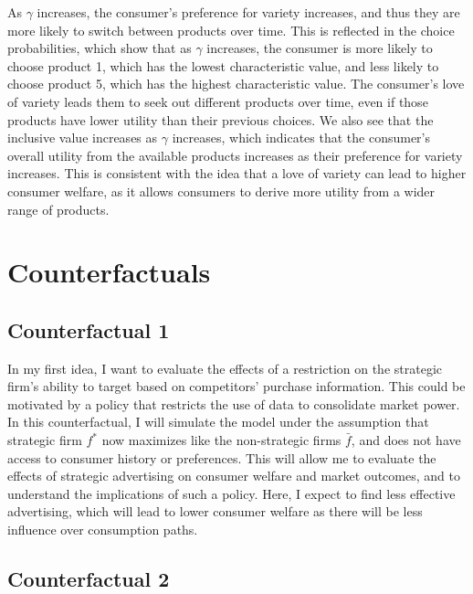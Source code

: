 \documentclass[12pt]{article}
\begin{document}
    As $\gamma$ increases, the consumer's preference for variety increases, and thus they are more likely to switch between products over time. This is reflected in the choice probabilities, which show that as $\gamma$ increases, the consumer is more likely to choose product 1, which has the lowest characteristic value, and less likely to choose product 5, which has the highest characteristic value. The consumer's love of variety leads them to seek out different products over time, even if those products have lower utility than their previous choices. We also see that the inclusive value increases as $\gamma$ increases, which indicates that the consumer's overall utility from the available products increases as their preference for variety increases. This is consistent with the idea that a love of variety can lead to higher consumer welfare, as it allows consumers to derive more utility from a wider range of products.


\section{Counterfactuals}

    \subsection{Counterfactual 1}

    In my first idea, I want to evaluate the effects of a restriction on the strategic firm's ability to target based on competitors' purchase information. This could be motivated by a policy that restricts the use of data to consolidate market power. In this counterfactual, I will simulate the model under the assumption that strategic firm $f^*$ now maximizes like the non-strategic firms $\bar{f}$, and does not have access to consumer history or preferences. This will allow me to evaluate the effects of strategic advertising on consumer welfare and market outcomes, and to understand the implications of such a policy. Here, I expect to find less effective advertising, which will lead to lower consumer welfare as there will be less influence over consumption paths.

    \subsection{Counterfactual 2}
\end{document}
